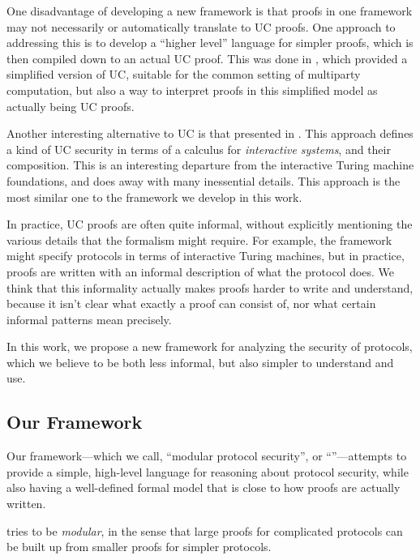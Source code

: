 One disadvantage of developing a new framework is that
proofs in one framework may not necessarily
or automatically translate to UC proofs.
One approach to addressing this is to develop
a ``higher level'' language for simpler proofs,
which is then compiled down to an actual UC proof.
This was done in \cite{C:CanCohLin15},
which provided a simplified version of UC, suitable
for the common setting of multiparty computation,
but also a way to interpret proofs in this simplified
model as actually being UC proofs.

Another interesting alternative to UC is that presented in
\cite{cramer2015secure}.
This approach defines a kind of UC security in terms of
a calculus for \emph{interactive systems},
and their composition.
This is an interesting departure from the interactive Turing machine
foundations, and does away with many inessential details.
This approach is the most similar one to the framework we develop
in this work.

In practice, UC proofs are often quite informal,
without explicitly mentioning the various details that the formalism
might require.
For example, the framework might specify protocols
in terms of interactive Turing machines, but in practice,
proofs are written with an informal description of what the protocol
does.
We think that this informality actually
makes proofs harder to write and understand,
because it isn't clear what exactly a proof can consist of,
nor what certain informal patterns mean precisely.

In this work, we propose a new framework for analyzing the security
of protocols, which we believe to be both less informal,
but also simpler to understand and use.

\subsection{Our Framework}

Our framework---which we call, ``modular protocol security'',
or ``\shortname''---attempts to provide a simple, high-level language
for reasoning about protocol security, while also having
a well-defined formal model that is close to how proofs
are actually written.

\shortname{} tries to be \emph{modular}, in the sense that
large proofs for complicated protocols can be built up from smaller proofs
for simpler protocols.

